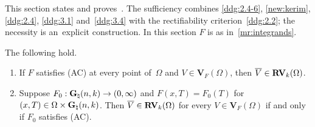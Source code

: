 \documentclass[a4paper,twoside,leqno]{article}
\newcommand{\Gk}{\pgrass{\adim}{\vdim}}        %
\begin{document}
\begin{miniremark}
    \label{mr:proof12}
    This section states and proves~\cite[Theorem~1.2]{DePhilippis2018}. The sufficiency combines
    \ref{ddg:2.4-6}, \ref{new:kerim}, \ref{ddg:2.4}, \ref{ddg:3.1} and~\ref{ddg:3.4} with the
    rectifiability criterion~\ref{ddg:2.2}; the necessity is an~explicit construction. In this
    section $F$ is as in~\ref{mr:integrands}.
\end{miniremark}

\begin{theorem}
    \label{ddg:1.2}
    The following hold.
    \begin{enumerate}
        \item
        \label{i:ddg:1.2:suff}
        If $F$ satisfies (AC) at every point of~$\Omega$ and $V \in \mathbf{V}_F(\Omega)$, then
        $\overline V \in \mathbf{RV}_{k}(\Omega)$.
        \item
        \label{i:ddg:1.2:nec}
        Suppose $F_0 : \Gk \to (0,\infty)$ and $F(x,T) = F_0(T)$ for $(x,T) \in \Omega \times \Gk$.
        Then $\overline V \in \mathbf{RV}_{k}(\Omega)$ for every $V \in \mathbf{V}_F(\Omega)$ if and only
        if $F_0$ satisfies (AC).
    \end{enumerate}
\end{theorem}
\end{document}
